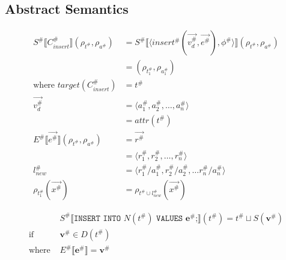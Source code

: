 \subsection{Abstract Semantics}

\begin{align*}
    S^\# \llbracket C_{insert}^\# \rrbracket (\rho_{t^\#}, \rho_{a^\#})
    &= S^\# \llbracket \langle insert^\#(\overset{\rightarrow}{v_d^\#}, \overset{\rightarrow}{e^\#}), \phi^\# \rangle \rrbracket (\rho_{t^\#}, \rho_{a^\#}) \\
    &= (\rho_{t_1^\#}, \rho_{a_1^\#}) \\
    \text{where } target(C_{insert}^\#) &= t^\# \\
    \overset{\rightarrow}{v_d^\#} &= \langle a_1^\#, a_2^\#, \dots, a_n^\# \rangle \\
    &= attr(t^\#) \\
    E^\# \llbracket \overset{\rightarrow}{e^\#} \rrbracket (\rho_{t^\#}, \rho_{a^\#})
    &= \overset{\rightarrow}{r^\#} \\
    &= \langle r_1^\#, r_2^\#, \dots, r_n^\# \rangle \\
    l_{new}^\# &= \langle r_1^\#/a_1^\#, r_2^\#/a_2^\#, \dots r_n^\#/a_n^\# \rangle \\
    \rho_{t_1^\#}(\overset{\rightarrow}{x^\#}) &= \rho_{t^\# \cup l_{new}^\#}(\overset{\rightarrow}{x^\#})
\end{align*}

\begin{align*}
    & S^\# \llbracket \texttt{INSERT INTO } N(t^\#) \texttt{ VALUES } \mathbf{e}^\# \texttt{;}\rrbracket (t^\#)
    = t^\# \sqcup S(\mathbf{v}^\#) \\
    \text{if }& \mathbf{v}^\# \in D(t^\#) \\
    \text{where }& E^\# \llbracket \mathbf{e}^\# \rrbracket
    = \mathbf{v}^\# \\
\end{align*}
